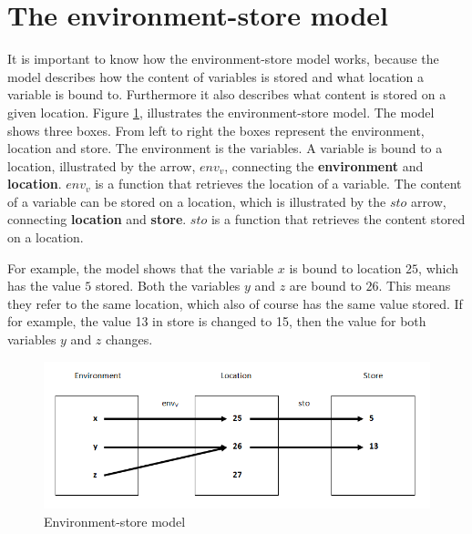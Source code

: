 \section{The environment-store model}\label{sec:es-model}
It is important to know how the environment-store model works, because the model describes how the content of variables is stored and what location a variable is bound to. Furthermore it also describes what content is stored on a given location. Figure \ref{fig:esmodel}, illustrates the environment-store model. The model shows three boxes. From left to right the boxes represent the environment, location and store. The environment is the variables. A variable is bound to a location, illustrated by the arrow, $env_v$, connecting the \textbf{environment} and \textbf{location}. $env_v$ is a function that retrieves the location of a variable. The content of a variable can be stored on a location, which is illustrated by the $sto$ arrow, connecting \textbf{location} and \textbf{store}. $sto$ is a function that retrieves the content stored on a location. 

For example, the model shows that the variable $x$ is bound to location $25$, which has the value $5$ stored. Both the variables $y$ and $z$ are bound to $26$. This means they refer to the same location, which also of course has the same value stored. If for example, the value 13 in store is changed to 15, then the value for both variables $y$ and $z$ changes.
\begin{figure}[H]
\includegraphics{billeder/environment_store_model.png}
\caption{Environment-store model}
\label{fig:esmodel}
\end{figure}